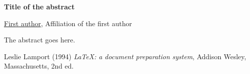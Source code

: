 \documentclass[a4paper, 11pt]{article}
\newcommand{\abstracttitle}[1]{{ \centering \LARGE \textbf{#1}\\ \vspace*{0.7cm} }}
\newcommand{\firstauthor}[2]{{ \centering \underline{#1}, \textsf{#2}\\ \vspace*{0.25cm} }}
\newcommand{\otherauthor}[2]{{ \centering #1, \textsf{#2}\\ \vspace*{0.25cm} }}
\newcommand{\abstracttext}[1]{ \vspace{0.6cm} #1 }
\begin{document}
\abstracttitle{Title of the abstract}

\firstauthor{First author}{Affiliation of the first author}

\abstracttext{
    The abstract goes here.
}

\begin{thebibliography}{9}
Leslie Lamport (1994) \emph{\LaTeX: a document preparation system}, Addison
Wesley, Massachusetts, 2nd ed.
\end{thebibliography}
\end{document}
